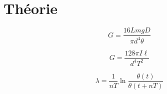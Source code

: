 \section{Théorie}

\begin{equation}
    G = \frac{16 L m g D}{\pi d^4 \theta}
    \label{eq:module_cisaillement_statique}
\end{equation}

\begin{equation}
    G = \frac{128 \pi I \ell}{d^4 T^2}
    \label{eq:module_cisaillement_dynamique}
\end{equation}

\begin{equation}
    \lambda = \frac{1}{nT} \ln \frac{\theta(t)}{\theta(t+nT)}
    \label{eq:decrement_log}
\end{equation}
